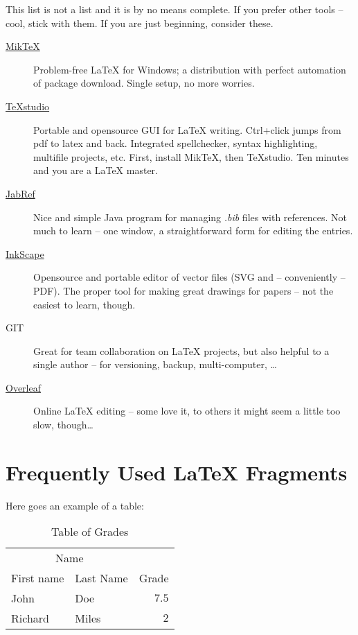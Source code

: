 \documentclass{ExcelAtFIT}
\begin{document}
This list is not a list and it is by no means complete.  If you prefer other tools -- cool, stick with them.  If you are just beginning, consider these.

\begin{description}
	\item[\href{http://miktex.org/download}{MikTeX}] Problem-free \LaTeX{} for Windows; a distribution with perfect automation of package download. Single setup, no more worries.
	\item[\href{http://texstudio.sourceforge.net/}{TeXstudio}] Portable and opensource GUI for \LaTeX{} writing.  Ctrl+click jumps from pdf to latex and back.  Integrated spellchecker, syntax highlighting, multifile projects, etc.  First, install MikTeX, then TeXstudio.  Ten minutes and you are a \LaTeX{} master.
	\item[\href{http://jabref.sourceforge.net/download.php}{JabRef}] Nice and simple Java program for managing \textit{.bib} files with references.  Not much to learn -- one window, a straightforward form for editing the entries.
	\item[\href{https://inkscape.org/en/download/}{InkScape}] Opensource and portable editor of vector files (SVG and -- conveniently -- PDF).  The proper tool for making great drawings for papers -- not the easiest to learn, though.
	\item[GIT] Great for team collaboration on \LaTeX{} projects, but also helpful to a single author -- for versioning, backup, multi-computer, \ldots
	\item[\href{http://www.overleaf.com/}{Overleaf}] Online \LaTeX{} editing -- some love it, to others it might seem a little too slow, though\ldots
\end{description}


\section{Frequently Used \LaTeX{} Fragments}
\label{sec:Fragments}

Here goes an example of a table:
\begin{table}[h]
	\vskip6pt
	\caption{Table of Grades}
	\centering
	\begin{tabular}{llr}
		\toprule
		\multicolumn{2}{c}{Name} \\
		\cmidrule(r){1-2}
		First name & Last Name & Grade \\
		\midrule
		John & Doe & $7.5$ \\
		Richard & Miles & $2$ \\
		\bottomrule
	\end{tabular}
	\label{tab:ExampleTable}
\end{table}
\end{document}

